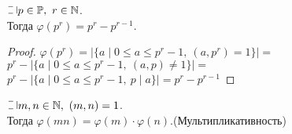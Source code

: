 \begin{normalsize}
\begin{theorem-non}
    $\letus p \in \mathP,~r \in \mathN$.\\
    Тогда $\varphi(p^r) = p^r - p^{r-1}$.
\end{theorem-non}

\begin{proof}
    $\varphi(p^r) = |\{a \mid 0 \leq a \leq p^r-1,~(a, p^r) = 1\}| = $\\
    $p^r -  |\{a \mid 0 \leq a \leq p^r-1,~(a, p) \neq 1\}| = $\\
    $p^r - |\{a \mid 0 \leq a \leq p^r-1,~p \mid a\}| = p^r - p^{r-1}$
\end{proof}

\begin{theorem-non}
    $\letus m, n \in \mathN,~(m, n) = 1$.\\
    Тогда $\varphi(mn) = \varphi(m) \cdot \varphi(n)$.(Мультипликативность)
\end{theorem-non}


\end{normalsize}
